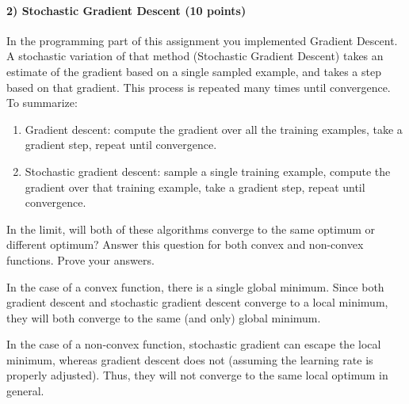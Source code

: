\documentclass{article}
\begin{document}
\paragraph{2) Stochastic Gradient Descent (10 points)}
In the programming part of this assignment you implemented Gradient Descent. A stochastic variation of that method (Stochastic Gradient Descent) takes an estimate of the gradient based on a single sampled example, and takes a step based on that gradient. This process is repeated many times until convergence. To summarize:
\begin{enumerate}
	\item Gradient descent: compute the gradient over all the training examples, take a gradient step, repeat until convergence.

	\item Stochastic gradient descent: sample a single training example, compute the gradient over that training example, take a gradient step, repeat until convergence.

\end{enumerate}

In the limit, will both of these algorithms converge to the same optimum or different optimum? Answer this question for both convex and non-convex functions. Prove your answers.
\begin{soln}
	In the case of a convex function, there is a single global minimum. Since both gradient descent and stochastic gradient descent converge to a local minimum, they will both converge to the same (and only) global minimum.

	In the case of a non-convex function, stochastic gradient can escape the local minimum, whereas gradient descent does not (assuming the learning rate is properly adjusted). Thus, they will not converge to the same local optimum in general.
\end{soln}

\newpage
\end{document}
